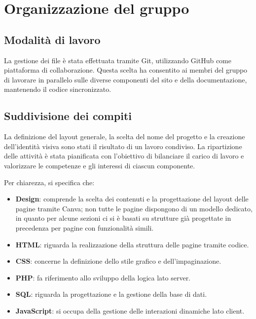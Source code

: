 \documentclass[10pt, letterpaper]{article}
\begin{document}
\section{Organizzazione del gruppo}
\subsection{Modalità di lavoro}
La gestione dei file è stata effettuata tramite Git, utilizzando GitHub come piattaforma di collaborazione. 
Questa scelta ha consentito ai membri del gruppo di lavorare in parallelo sulle diverse componenti del sito e della documentazione, mantenendo il codice sincronizzato.

\subsection{Suddivisione dei compiti}
La definizione del layout generale, la scelta del nome del progetto e la creazione dell'identità visiva sono stati il risultato di un lavoro condiviso.
La ripartizione delle attività è stata pianificata con l’obiettivo di bilanciare il carico di lavoro e valorizzare le competenze e gli interessi di ciascun componente.

Per chiarezza, si specifica che:
\begin{itemize}
    \item \textbf{Design}: comprende la scelta dei contenuti e la progettazione del layout delle pagine tramite Canva; non tutte le pagine dispongono di un modello dedicato, in quanto per alcune sezioni ci si è basati su strutture già progettate in precedenza per pagine con funzionalità simili.
    \item \textbf{HTML}: riguarda la realizzazione della struttura delle pagine tramite codice.
    \item \textbf{CSS}: concerne la definizione dello stile grafico e dell’impaginazione.
    \item \textbf{PHP}: fa riferimento allo sviluppo della logica lato server.
    \item \textbf{SQL}: riguarda la progettazione e la gestione della base di dati.
    \item \textbf{JavaScript}: si occupa della gestione delle interazioni dinamiche lato client.
\end{itemize}
\end{document}
